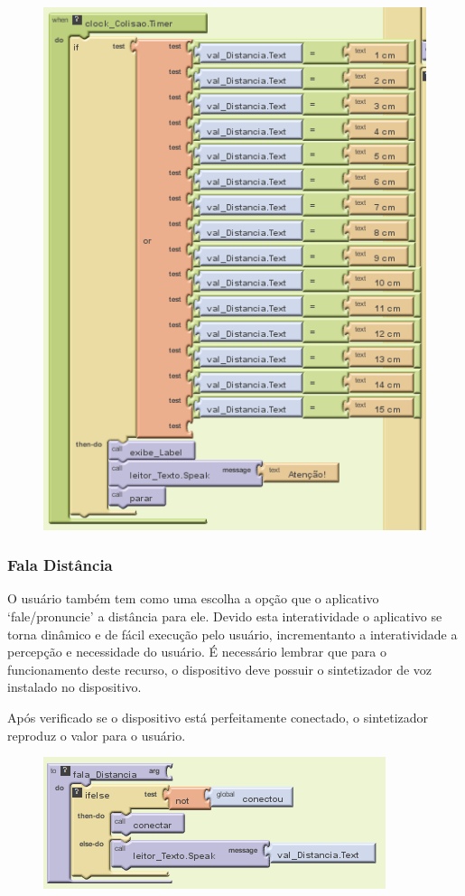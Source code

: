\documentclass[portugues, brazil, a4paper,12pt]{article}
\begin{document}
\begin{figure}[H]
	\centering
	\includegraphics[scale=.8]{img/controle/colisao.png}
	
\end{figure}


\subsubsection{Fala Distância}
O usuário também tem como uma escolha a opção que o aplicativo `fale/pronuncie' a distância para ele. Devido esta interatividade o aplicativo se torna dinâmico e de fácil execução pelo usuário, incrementanto a interatividade a percepção e necessidade do usuário. É necessário lembrar que para o funcionamento deste recurso, o dispositivo deve possuir o sintetizador de voz instalado no dispositivo.

Após verificado se o dispositivo está perfeitamente conectado, o sintetizador reproduz o valor para o usuário.

\begin{figure}[H]
	\centering
	\includegraphics[scale=.8]{img/controle/distanciaFala.png}
	
\end{figure}
\end{document}

